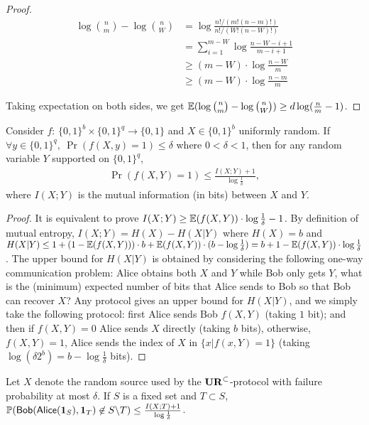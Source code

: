 \begin{proof}
  \begin{align}
  \log {n \choose m}-\log {n \choose W}
  &= \log \frac{n!/(m!(n-m)!)}{n!/(W!(n-W)!)} \\
  &= \sum_{i=1}^{m-W}\log \frac{n-W-i+1}{m-i+1} \\
  &\ge (m-W)\cdot \log \frac{n-W}{m} \\
  &\ge (m-W)\cdot \log \frac{n-m}{m}
  \end{align}
  
  Taking expectation on both sides, we get $\operatorname*{\mathbb{E}}(\log {n \choose m}-\log {n \choose W})\ge d \log (\frac{n}{m}-1)$. 
\end{proof}

\begin{lemma}\label{lemma:mutual-entropy-vs-fail-prob}
  Consider $f$: $\{0,1\}^b\times \{0,1\}^q\rightarrow \{0,1\}$ and $X\in\{0,1\}^b$ uniformly random. If $\forall y\in \{0,1\}^q,\ \Pr(f(X,y)=1)\le \delta$ where $0<\delta<1$, then for any random variable $Y$ supported on $\{0,1\}^q$,
  \begin{align}
  \Pr(f(X,Y)=1)\le \frac{I(X;Y)+1}{\log \frac{1}{\delta}},
  \end{align}
  where $I(X;Y)$ is the mutual information (in bits) between $X$ and $Y$.
\end{lemma}

\begin{proof}
  It is equivalent to prove $I(X;Y)\ge \operatorname*{\mathbb{E}}(f(X,Y))\cdot \log\frac{1}{\delta}-1$. By definition of mutual entropy, $I(X;Y)=H(X)-H(X|Y)$ where $H(X)=b$ and $H(X|Y)\le 1+(1-\operatorname*{\mathbb{E}}(f(X,Y)))\cdot b+\operatorname*{\mathbb{E}}(f(X,Y))\cdot (b-\log\frac{1}{\delta})=b+1-\operatorname*{\mathbb{E}}(f(X,Y))\cdot \log\frac{1}{\delta}$.
  The upper bound for $H(X|Y)$ is obtained by considering the following one-way communication problem: Alice obtains both $X$ and $Y$ while Bob only gets $Y$, what is the (minimum) expected number of bits that Alice sends to Bob so that Bob can recover $X$? 
  Any protocol gives an upper bound for $H(X|Y)$, and we simply take the following protocol: first Alice sends Bob $f(X,Y)$ (taking $1$ bit); and then if $f(X,Y)=0$ Alice sends $X$ directly (taking $b$ bits), otherwise, $f(X,Y)=1$, Alice sends the index of $X$ in $\{x|f(x,Y)=1\}$ (taking $\log (\delta 2^b)=b-\log\frac{1}{\delta}$ bits).  
\end{proof}

\begin{corollary}\label{corollary:sampler-failure}
  Let $X$ denote the random source used by the $\mathbf{UR}^\subset$-protocol with failure probability at most $\delta$. If $S$ is a fixed set and $T\subset S$, $\operatorname*{\mathbb{P}}(\mathsf{Bob}(\mathsf{Alice}(\mathbf{1}_S), \mathbf{1}_T)\not\in S\backslash T)\le \frac{I(X;T)+1}{\log\frac{1}{\delta}}$.
\end{corollary}

